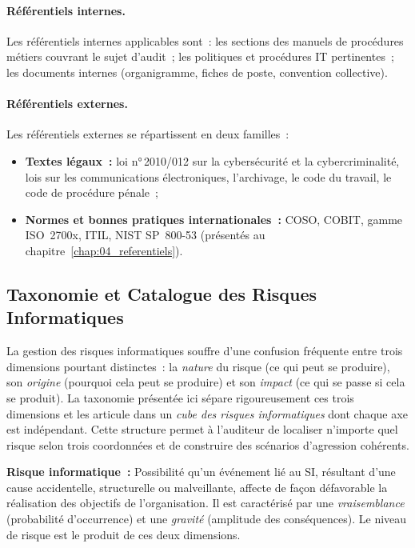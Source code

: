 \paragraph{Référentiels internes.}
Les référentiels internes applicables sont~: les sections des manuels de procédures
métiers couvrant le sujet d'audit~; les politiques et procédures IT pertinentes~;
les documents internes (organigramme, fiches de poste, convention collective).

\paragraph{Référentiels externes.}
Les référentiels externes se répartissent en deux familles~:
\begin{itemize}
    \item \textbf{Textes légaux~:} loi n°\,2010/012 sur la cybersécurité et la
        cybercriminalité, lois sur les communications électroniques, l'archivage,
        le code du travail, le code de procédure pénale~;
    \item \textbf{Normes et bonnes pratiques internationales~:} COSO, COBIT, gamme
        ISO~2700x, ITIL, NIST SP~800-53 (présentés au chapitre~\ref{chap:04_referentiels}).
\end{itemize}

\subsection{Taxonomie et Catalogue des Risques Informatiques}
\label{sec:risques-informatiques}

La gestion des risques informatiques souffre d'une confusion fréquente entre trois
dimensions pourtant distinctes~: la \emph{nature} du risque (ce qui peut se produire),
son \emph{origine} (pourquoi cela peut se produire) et son \emph{impact} (ce qui se
passe si cela se produit). La taxonomie présentée ici sépare rigoureusement ces trois
dimensions et les articule dans un \emph{cube des risques informatiques} dont chaque
axe est indépendant. Cette structure permet à l'auditeur de localiser n'importe quel
risque selon trois coordonnées et de construire des scénarios d'agression cohérents.

\begin{boxdef}
\textbf{Risque informatique~:}
Possibilité qu'un événement lié au SI, résultant d'une cause accidentelle, structurelle
ou malveillante, affecte de façon défavorable la réalisation des objectifs de
l'organisation. Il est caractérisé par une \emph{vraisemblance} (probabilité
d'occurrence) et une \emph{gravité} (amplitude des conséquences). Le niveau de risque
est le produit de ces deux dimensions.
\end{boxdef}

